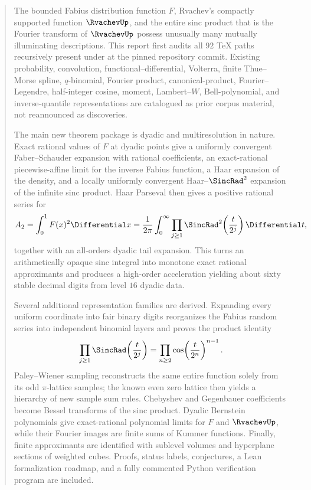 \documentclass[11pt]{article}
\theoremstyle{definition}
\theoremstyle{remark}
\begin{document}
\begin{abstract}
The bounded Fabius distribution function $F$, Rvachev's compactly supported
function $\RvachevUp$, and the entire sinc product that is the Fourier transform of
$\RvachevUp$ possess unusually many mutually illuminating descriptions.  This report
first audits all $92$ TeX paths recursively present under
 at the pinned repository commit.  Existing
probability, convolution, functional--differential, Volterra, finite
Thue--Morse spline, $q$-binomial, Fourier product, canonical-product,
Fourier--Legendre, half-integer cosine, moment, Lambert--$W$, Bell-polynomial,
and inverse-quantile representations are catalogued as prior corpus material,
not reannounced as discoveries.

The main new theorem package is dyadic and multiresolution in nature.  Exact
rational values of $F$ at dyadic points give a uniformly convergent
Faber--Schauder expansion with rational coefficients, an exact-rational
piecewise-affine limit for the inverse Fabius function, a Haar expansion of
the density, and a locally uniformly convergent Haar--$\SincRad^2$ expansion of
the infinite sinc product.  Haar Parseval then gives a positive rational series
for
\[
 A_2=\int_0^1F(x)^2\Differential x
    =\frac1{2\pi}\int_0^\infty
      \prod_{j\ge1}\SincRad^2\!\left(\frac{t}{2^j}\right)\Differential t,
\]
together with an all-orders dyadic tail expansion.  This turns an arithmetically
opaque sinc integral into monotone exact rational approximants and produces a
high-order acceleration yielding about sixty stable decimal digits from level
$16$ dyadic data.

Several additional representation families are derived.  Expanding every
uniform coordinate into fair binary digits reorganizes the Fabius random
series into independent binomial layers and proves the product identity
\[
 \prod_{j\ge1}\SincRad\!\left(\frac{t}{2^j}\right)
 =\prod_{n\ge2}\cos\!\left(\frac{t}{2^n}\right)^{n-1}.
\]
Paley--Wiener sampling reconstructs the same entire function solely from its
odd $\pi$-lattice samples; the known even zero lattice then yields a hierarchy
of new sample sum rules.  Chebyshev and Gegenbauer coefficients become
Bessel transforms of the sinc product.  Dyadic Bernstein polynomials give
exact-rational polynomial limits for $F$ and $\RvachevUp$, while their Fourier images
are finite sums of Kummer functions.  Finally, finite approximants are
identified with sublevel volumes and hyperplane sections of weighted cubes.
Proofs, status labels, conjectures, a Lean formalization roadmap, and a fully
commented Python verification program are included.
\end{abstract}
\end{document}
